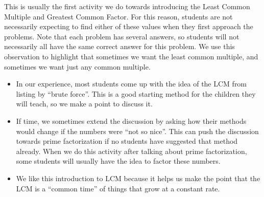 \documentclass{ximera}
\begin{document}
\newpage
\begin{instructorNotes}
This is usually the first activity we do towards introducing the Least Common Multiple and Greatest Common Factor.  For this reason, students are not necessarily expecting to find either of these values when they first approach the problems.  Note that each problem has several answers, so students will not necessarily all have the same correct answer for this problem. We use this observation to highlight that sometimes we want the least common multiple, and sometimes we want just any common multiple.

\begin{itemize}
	\item In our experience, most students come up with the idea of the LCM from listing by ``brute force''. This is a good starting method for the children they will teach, so we make a point to discuss it.
	\item If time, we sometimes extend the discussion by asking how their methods would change if the numbers were ``not so nice''.  This can push the discussion towards prime factorization if no students have suggested that method already.  When we do this activity after talking about prime factorization, some students will usually have the idea to factor these numbers.
	\item We like this introduction to LCM because it helps us make the point that the LCM is a ``common time'' of things that grow at a constant rate. %
\end{itemize}

\end{instructorNotes}
\end{document}
